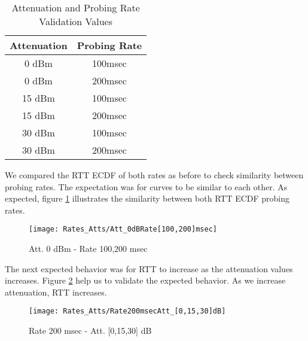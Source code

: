 \begin{table}[h]
\begin{center}
	\begin{tabular}{||c c||}
		\hline
		Attenuation & Probing Rate\\ [0.5ex] 
		\hline\hline
		0 dBm & 100msec\\ 
		\hline
		0 dBm & 200msec\\
		\hline
		15 dBm & 100msec\\
		\hline
		15 dBm & 200msec\\
		\hline
		30 dBm & 100msec\\
		\hline
		30 dBm & 200msec\\ [1ex] 
		\hline
	\end{tabular}
\end{center}
\caption{Attenuation and Probing Rate Validation Values}
\label{table:Att_Rate_Test_Values}
\end{table}

We compared the RTT ECDF of both rates as before to check similarity between probing rates. The expectation was for curves to be similar to each other. As expected, figure \ref{image:att_0_100and200msec} illustrates the similarity between both RTT ECDF probing rates.

\begin{figure}[h]
	\centering
	\texttt{[image: Rates\_Atts/Att\_0dBRate[100,200]msec]}
	\caption{Att. 0 dBm - Rate 100,200 msec}
	\label{image:att_0_100and200msec}
\end{figure}

The next expected behavior was for RTT to increase as the attenuation values increases. Figure \ref{image:rate_200msec_Att_0_15_30dBm} help us to validate the expected behavior. As we increase attenuation, RTT increases.

\begin{figure}[h]
	\centering
	\texttt{[image: Rates\_Atts/Rate200msecAtt\_[0,15,30]dB]}
	\caption{Rate 200 msec - Att. [0,15,30] dB}
	\label{image:rate_200msec_Att_0_15_30dBm}
\end{figure}